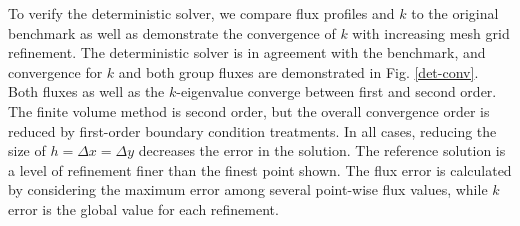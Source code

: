 \documentclass{mc2015}
\begin{document}
To verify the deterministic solver, we compare flux profiles and $k$ to the original benchmark\cite{benchmark} as well as demonstrate the convergence of $k$ with increasing mesh grid refinement.  The deterministic solver is in agreement with the benchmark, and convergence for $k$ and both group fluxes are demonstrated in Fig. \ref{det-conv}.  Both fluxes as well as the $k$-eigenvalue converge between first and second order.  The finite volume method is second order, but the overall convergence order is reduced by first-order boundary condition treatments.  In all cases, reducing the size of $h=\Delta x=\Delta y$ decreases the error in the solution.  The reference solution is a level of refinement finer than the finest point shown.   The flux error is calculated by considering the maximum error among several point-wise flux values, while $k$ error is the global value for each refinement.
\end{document}
